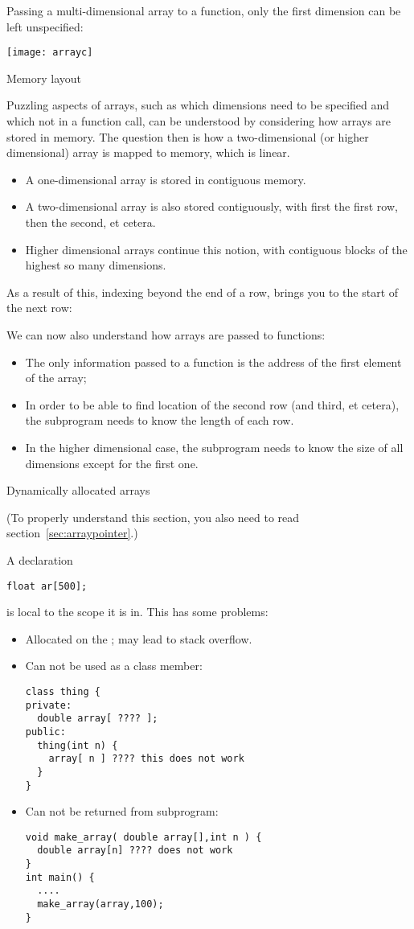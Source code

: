 Passing a multi-dimensional array to a function, only the first
dimension can be left unspecified:
%

\texttt{[image: arrayc]}

 {Memory layout}

Puzzling aspects of arrays, such as which dimensions need to be
specified and which not in a function call, can be understood by
considering how arrays are stored in memory.
The question then is how a two-dimensional (or higher dimensional)
array is mapped to memory, which is linear.
\begin{itemize}
\item A one-dimensional array is stored in contiguous memory.
\item A two-dimensional array is also stored contiguously, with first
  the first row, then the second, et cetera.
\item Higher dimensional arrays continue this notion, with contiguous
  blocks of the highest so many dimensions.
\end{itemize}

As a result of this, indexing beyond the end of a row, brings you to the
start of the next row:
%

We can now also understand how arrays are passed to functions:
\begin{itemize}
\item The only information passed to a function is the address of the
  first element of the array;
\item In order to be able to find location of the second row (and
  third, et cetera), the subprogram needs to know the length of each
  row.
\item In the higher dimensional case, the subprogram needs to know the
  size of all dimensions except for the first one.
\end{itemize}

 {Dynamically allocated arrays}
\label{sec:arraynew}

(To properly understand this section, you also need to read
section~\ref{sec:arraypointer}.)

A declaration 
\begin{verbatim}
float ar[500];
\end{verbatim}
is local to the scope it is in. This has some problems:
\begin{itemize}
\item Allocated on the ; may lead to stack overflow.
\item Can not be used as a class member:
\begin{verbatim}
class thing {
private:
  double array[ ???? ];
public:
  thing(int n) {
    array[ n ] ???? this does not work
  }
}
\end{verbatim}
\item Can not be returned from subprogram:
\begin{verbatim}
void make_array( double array[],int n ) {
  double array[n] ???? does not work
}
int main() {
  ....
  make_array(array,100);
}
\end{verbatim}
\end{itemize}

